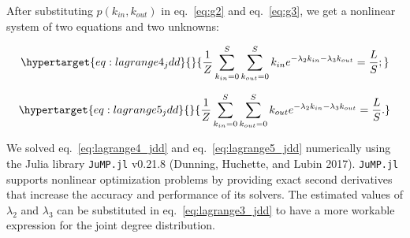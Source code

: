 \documentclass[10pt,oneside]{article}
\begin{document}
After substituting \(p(k_{in},k_{out})\) in eq.~\ref{eq:g2} and
eq.~\ref{eq:g3}, we get a nonlinear system of two equations and two
unknowns:

\begin{equation}\protect\hypertarget{eq:lagrange4_jdd}{}{\frac{1}{Z}\sum_{k_{in}=0}^S\sum_{k_{out}=0}^S k_{in} e^{-\lambda_2k_{in}-\lambda_3k_{out}}  = \frac{L}{S};}\label{eq:lagrange4_jdd}\end{equation}

\begin{equation}\protect\hypertarget{eq:lagrange5_jdd}{}{\frac{1}{Z}\sum_{k_{in}=0}^S\sum_{k_{out}=0}^S k_{out} e^{-\lambda_2k_{in}-\lambda_3k_{out}}  = \frac{L}{S}.}\label{eq:lagrange5_jdd}\end{equation}

We solved eq.~\ref{eq:lagrange4_jdd} and eq.~\ref{eq:lagrange5_jdd}
numerically using the Julia library \texttt{JuMP.jl} v0.21.8 (Dunning,
Huchette, and Lubin 2017). \texttt{JuMP.jl} supports nonlinear
optimization problems by providing exact second derivatives that
increase the accuracy and performance of its solvers. The estimated
values of \(\lambda_2\) and \(\lambda_3\) can be substituted in
eq.~\ref{eq:lagrange3_jdd} to have a more workable expression for the
joint degree distribution.
\end{document}
